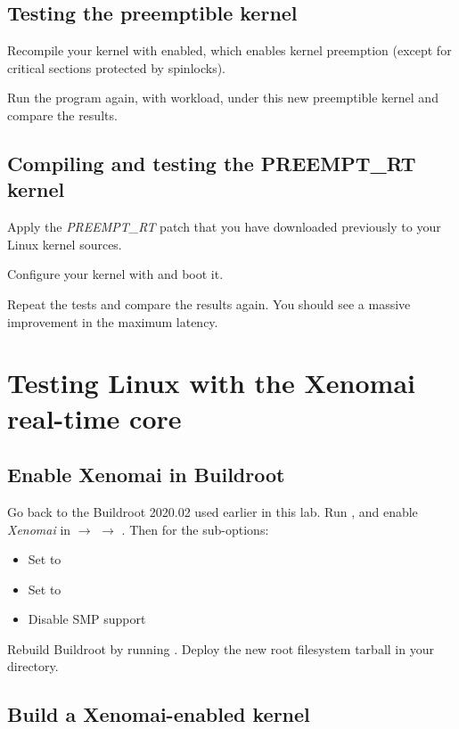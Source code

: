 \subsection{Testing the preemptible kernel}

Recompile your kernel with  enabled, which
enables kernel preemption (except for critical sections protected by
spinlocks).

Run the  program again, with workload, under this new
preemptible kernel and compare the results.

\subsection{Compiling and testing the PREEMPT\_RT kernel}

Apply the {\em PREEMPT\_RT} patch that you have downloaded previously
to your Linux kernel sources.

Configure your kernel with  and boot it.

Repeat the tests and compare the results again. You should see a massive
improvement in the maximum latency.

\section{Testing Linux with the Xenomai real-time core}

\subsection{Enable Xenomai in Buildroot}

Go back to the Buildroot 2020.02 used earlier in this lab. Run
, and enable {\em Xenomai} in  $\rightarrow$  $\rightarrow$ . Then for the sub-options:

\begin{itemize}
\item Set  to 
\item Set  to 
\item Disable SMP support
\end{itemize}

Rebuild Buildroot by running . Deploy the new root
filesystem tarball in your  directory.

\subsection{Build a Xenomai-enabled kernel}

